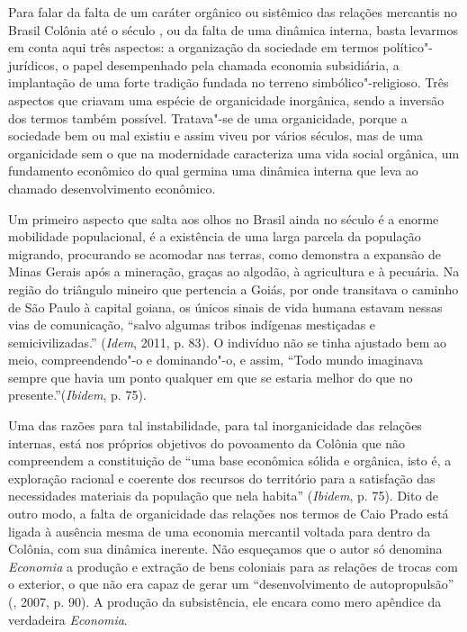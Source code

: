 {Para falar da falta de um caráter orgânico ou sistêmico das relações
mercantis no Brasil Colônia até o século , ou da falta de uma
dinâmica interna, basta levarmos em conta aqui três aspectos: a
organização da sociedade em termos político"-jurídicos, o papel
desempenhado pela chamada economia subsidiária, a implantação de uma
forte tradição fundada no terreno simbólico"-religioso. Três aspectos que
criavam uma espécie de organicidade inorgânica, sendo a inversão dos
termos também possível. Tratava"-se de uma organicidade, porque a
sociedade bem ou mal existiu e assim viveu por vários séculos,
mas de uma organicidade sem o que na modernidade caracteriza
uma vida social orgânica, um fundamento econômico do qual germina uma
dinâmica interna que leva ao chamado desenvolvimento econômico.

Um primeiro aspecto que salta aos olhos no Brasil ainda no século  é
a enorme mobilidade populacional, é a existência de uma larga parcela da
população migrando, procurando se acomodar nas terras, como demonstra a
expansão de Minas Gerais após a mineração, graças ao algodão, à
agricultura e à pecuária. Na região do triângulo mineiro que pertencia a
Goiás, por onde transitava o caminho de São Paulo à capital goiana, os
únicos sinais de vida humana estavam nessas vias de comunicação, ``salvo
algumas tribos indígenas mestiçadas e semicivilizadas.'' (\emph{Idem},
2011, p. 83). O indivíduo não se tinha ajustado bem ao meio,
compreendendo"-o e dominando"-o, e assim, ``Todo mundo imaginava sempre
que havia um ponto qualquer em que se estaria melhor do que no
presente.''(\emph{Ibidem}, p. 75).

Uma das razões para tal instabilidade, para tal inorganicidade das
relações internas, está nos próprios objetivos do povoamento da Colônia
que não compreendem a constituição de ``uma base econômica sólida e
orgânica, isto é, a exploração racional e coerente dos recursos do
território para a satisfação das necessidades materiais da população que
nela habita'' (\emph{Ibidem}, p. 75). Dito de outro modo, a falta
de organicidade das relações nos termos de Caio Prado está ligada à
ausência mesma de uma economia mercantil voltada para dentro da Colônia,
com sua dinâmica inerente. Não esqueçamos que o autor só denomina
\emph{Economia} a produção e extração de bens coloniais para as relações
de trocas com o exterior, o que não era capaz de gerar um
``desenvolvimento de autopropulsão'' (, 2007, p. 90). A produção
da subsistência, ele encara como mero apêndice da verdadeira
\emph{Economia}.

}
